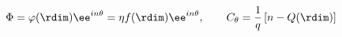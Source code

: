 \begin{equation}\label{eq:ansatz}
\Phi= \varphi(\rdim)\ee^{i n\theta} = \eta f(\rdim)\ee^{i
n\theta},\qquad C_\theta= \displaystyle
\frac{1}{q}\left[n-Q(\rdim)\right]
\end{equation}

